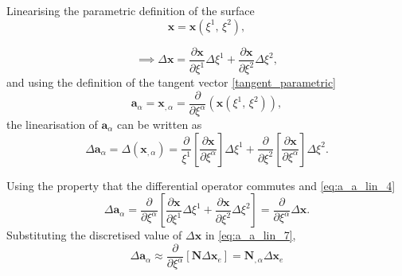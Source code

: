 \documentclass[../main.tex]{subfiles}
\begin{document}
\begin{appendices}
Linearising the parametric definition of the surface 
    \begin{equation}\label{eq:a_a_lin_3}
        \boldsymbol{x} = \boldsymbol{x} \left( \xi^{1}, \, \xi^{2} \right),
    \end{equation}
    
    \begin{equation}\label{eq:a_a_lin_4}
       \implies \Delta \boldsymbol{x} = \frac{\partial \boldsymbol{x}}{\partial \xi^{1}} \Delta \xi^{1} + \frac{\partial \boldsymbol{x}}{\partial \xi^{2}} \Delta \xi^{2},
    \end{equation}
and using the definition of the tangent vector \eqref{tangent_parametric} 
\begin{equation}\label{eq:a_a_lin_2}
    \boldsymbol{a}_{\alpha} = \boldsymbol{x}_{, \alpha} = \frac{\partial}{\partial \xi^{\alpha}} \left( \boldsymbol{x} \left( \xi^{1}, \, \xi^{2} \right) \right), 
\end{equation}
the linearisation of $\boldsymbol{a}_{\alpha}$ can be written as 
    \begin{equation}\label{eq:a_a_lin_6}
        \Delta \boldsymbol{a}_{\alpha} = \Delta \left( \boldsymbol{x}_{, \alpha}\right) = \frac{\partial}{\xi^{1}} \left[ \frac{\partial \boldsymbol{x}}{\partial \xi^{\alpha}} \right] \Delta \xi^{1} + \frac{\partial}{\partial \xi^{2}} \left[ \frac{\partial \boldsymbol{x}}{\partial \xi^{\alpha}} \right] \Delta \xi^{2}.
    \end{equation}
    
Using the property that the differential operator commutes and \eqref{eq:a_a_lin_4}     
    \begin{equation}\label{eq:a_a_lin_7}
        \Delta \boldsymbol{a}_{\alpha} = \frac{\partial}{\partial \xi^{\alpha}} \left[ \frac{\partial \boldsymbol{x}}{\partial \xi^{1}} \Delta \xi^{1} + \frac{\partial \boldsymbol{x}}{\partial \xi^{2}} \Delta \xi^{2} \right] = \frac{\partial}{\partial \xi^{\alpha}} \Delta \boldsymbol{x}.
    \end{equation}
Substituting the discretised value of $\Delta \boldsymbol{x}$ in \eqref{eq:a_a_lin_7},    
    \begin{equation}\label{eq:a_a_lin_8}
        \Delta \boldsymbol{a}_{\alpha} \approx \frac{\partial}{\partial \xi^{\alpha}} \left[ \mathbf{N} \Delta \mathbf{x}_{e} \right] = \mathbf{N}_{, \alpha} \Delta \mathbf{x}_{e}
    \end{equation}
     

\end{appendices}
\end{document}
